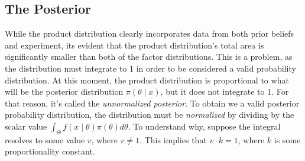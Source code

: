 \documentclass[12pt]{article}
\begin{document}
\subsection*{The Posterior}
\noindent While the product distribution clearly incorporates data from both prior beliefs and experiment, its evident that the product distribution's total area is significantly smaller than both of the factor distributions. This is a problem, as the distribution must integrate to 1 in order to be considered a valid probability distribution. At this moment, the product distribution is proportional to what will be the posterior distribution $\pi(\theta \mid x)$, but it does not integrate to 1. For that reason, it's called the \textit{unnormalized posterior}. To obtain we a valid posterior probability distribution, the distribution must be \textit{normalized} by dividing by the scalar value $\int_{\Theta} f(x \mid \theta) \pi(\theta) d\theta$. To understand why, suppose the integral resolves to some value $v$, where $v \neq 1$. This implies that $v \cdot k = 1$, where $k$ is some proportionality constant.
\end{document}
